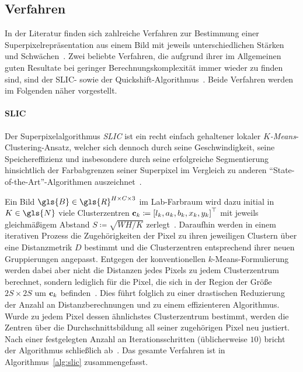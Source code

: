 \subsection{Verfahren}
\label{superpixel_verfahren}

In der Literatur finden sich zahlreiche Verfahren zur Bestimmung einer Superpixelrepräsentation aus einem Bild mit jeweils unterschiedlichen Stärken und Schwächen~\cite{super, slic}.
Zwei beliebte Verfahren, die aufgrund ihrer im Allgemeinen guten Resultate bei geringer Berechnungskomplexität immer wieder zu finden sind, sind der SLIC- sowie der Quickshift-Algorithmus~\cite{slic, super, Gadde, supercnn, Fulkerson}.
Beide Verfahren werden im Folgenden näher vorgestellt.

\paragraph{SLIC}
\label{slic}

Der Superpixelalgorithmus \emph{\gls{SLIC}} ist ein recht einfach gehaltener lokaler \emph{$K$-Means}-Clustering-Ansatz, welcher sich dennoch durch seine Geschwindigkeit, seine Speichereffizienz und insbesondere durch seine erfolgreiche Segmentierung hinsichtlich der Farbabgrenzen seiner Superpixel im Vergleich zu anderen \enquote{State-of-the-Art}-Algorithmen auszeichnet~\cite{slic, Gadde}.

Ein Bild $\gls{B} \in \gls{R}^{H \times C \times 3}$ im Lab-Farbraum wird dazu initial in $K \in \gls{N}$ viele Clusterzentren $\ve{c}_k \coloneqq {\left[l_k, a_k, b_k, x_k, y_k\right]}^{\top}$  mit jeweils gleichmäßigem Abstand $S \coloneqq \sqrt{WH/K}$ zerlegt~\cite{slic}.
Daraufhin werden in einem iterativen Prozess die Zugehörigkeiten der Pixel zu ihren jeweiligen Clustern über eine Distanzmetrik $D$ bestimmt und die Clusterzentren entsprechend ihrer neuen Gruppierungen angepasst.
Entgegen der konventionellen $k$-Means-Formulierung werden dabei aber nicht die Distanzen jedes Pixels zu jedem Clusterzentrum berechnet, sondern lediglich für die Pixel, die sich in der Region der Größe $2S \times 2S$ um $\mathbf{c}_k$ befinden~\cite{slic}.
Dies führt folglich zu einer drastischen Reduzierung der Anzahl an Distanzberechnungen und zu einem effizienteren Algorithmus.
Wurde zu jedem Pixel dessen ähnlichstes Clusterzentrum bestimmt, werden die Zentren über die Durchschnittsbildung all seiner zugehörigen Pixel neu justiert.
Nach einer festgelegten Anzahl an Iterationsschritten (üblicherweise $10$) bricht der Algorithmus schließlich ab~\cite{slic}.
Das gesamte Verfahren ist in Algorithmus~\ref{alg:slic} zusammengefasst.

